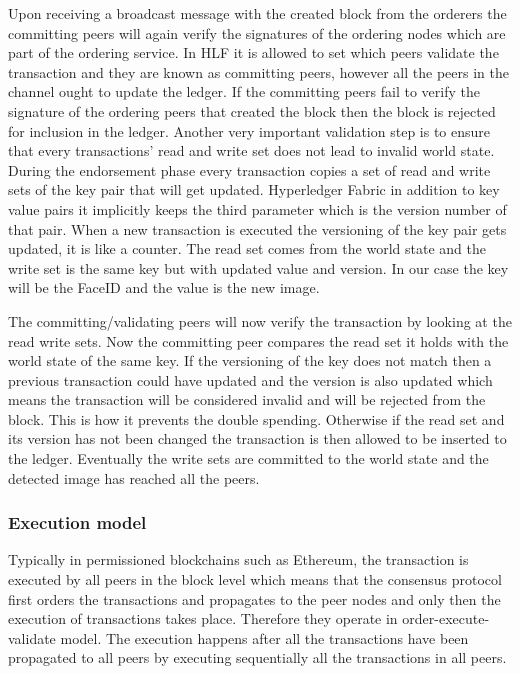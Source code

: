 Upon receiving a broadcast message with the created block from the orderers the committing peers will again verify the signatures of the ordering nodes which are part of the ordering service. In HLF it is allowed to set which peers validate the transaction and they are known as committing peers, however all the peers in the channel ought to update the ledger.
If the committing peers fail to verify the signature of the ordering peers that created the block then the block is rejected for inclusion in the ledger. Another very important validation step is to ensure that every transactions' read and write set does not lead to invalid world state. During the endorsement phase every transaction copies a set of read and write sets of the key pair that will get updated. Hyperledger Fabric in addition to key value pairs it implicitly keeps the third parameter which is the version number of that pair. When a new transaction is executed the versioning  of the key pair gets updated, it is like a counter. The read set comes from the world state and the write set is the same key but with updated value and version. In our case the key will be the FaceID and the value is the new image.

The committing/validating peers will now verify the transaction by looking at the read write sets. Now the committing peer compares the read set it holds with the world state of the same key. If the versioning of the key does not match then a previous transaction could have updated and the version is also updated which means the transaction will be considered invalid and will be rejected from the block. This is how it prevents the double spending. Otherwise if the read set and its version has not been changed the transaction is then allowed to be inserted to the ledger. Eventually the write sets are committed to the world state and the detected image has reached all the peers. 
 
 \subsubsection{Execution model}
 
 
 Typically in permissioned blockchains such as Ethereum, the transaction is executed by all peers in the block level which means that the consensus protocol first orders the transactions and propagates to the peer nodes and only then the execution of transactions takes place. Therefore they operate in order-execute-validate model. The execution happens after all the transactions have been propagated to all peers by executing sequentially all the transactions in all peers.
 
